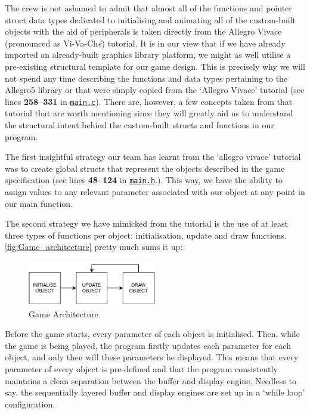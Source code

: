 \documentclass[11pt]{article}
\newcommand{\lineref}[1]{lines \textbf{#1}}
\begin{document}
The crew is not ashamed to admit that almost all of the functions and pointer struct data types dedicated to initialising and animating all of the custom-built objects with the aid of peripherals is taken directly from the Allegro Vivace (pronounced as Vi-Va-Ch\textit{\'{e}}) tutorial. It is in our view that if we have already imported an already-built graphics library platform, we might as well utilise a pre-existing structural template for our game design. This is precisely why we will not spend any time describing the functions and data types pertaining to the Allegro5 library or that were simply copied from the `Allegro Vivace' tutorial (see \lineref{258--331} in \hyperref[app:main-c]{\texttt{main.c}}). There are, however, a few concepts taken from that tutorial that are worth mentioning since they will greatly aid us to understand the structural intent behind the custom-built structs and functions in our program.  

The first insightful strategy our team has learnt from the `allegro vivace' tutorial was to create global structs that represent the objects described in the game specification (see \lineref{48--124} in \hyperref[app:main-h]{\texttt{main.h}}.). This way, we have the ability to assign values to any relevant parameter associated with our object at any point in our main function.

The second strategy we have mimicked from the tutorial is the use of at least three types of functions per object: initialisation, update and draw functions. \autoref{fig:Game_architecture} pretty much sums it up:

\begin{figure}[ht]
    \centering
    \includegraphics[width=0.5\textwidth]{Game_Architecture.pdf}
    \caption{Game Architecture}
    \label{fig:Game_architecture}
\end{figure}

Before the game starts, every parameter of each object is initialised. Then, while the game is being played, the program firstly updates each parameter for each object, and only then will these parameters be displayed. This means that every parameter of every object is pre-defined and that the program consistently maintains a clean separation between the buffer and display engine. Needless to say, the sequentially layered buffer and display engines are set up in a `while loop' configuration.
\end{document}
